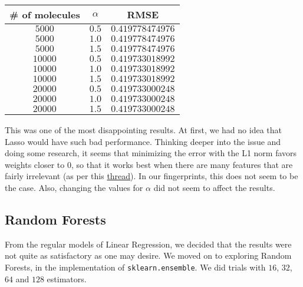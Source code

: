 \documentclass[10pt]{article}
\begin{document}
\begin{center}

\begin{tabular}[center]{|c|c|c|}
\hline
\# of molecules & $\alpha$ & RMSE \\
\hline
$5000$ & $0.5$ & $0.419778474976$ \\
\hline 
$5000$ & $1.0$ & $0.419778474976$ \\
\hline 
$5000$ & $1.5$ & $0.419778474976$ \\
\hline 
$10000$ & $0.5$ & $0.419733018992$ \\
\hline 
$10000$ & $1.0$ & $0.419733018992$ \\
\hline 
$10000$ & $1.5$ & $0.419733018992$ \\
\hline
$20000$ & $0.5$ & $0.419733000248$ \\
\hline 
$20000$ & $1.0$ & $0.419733000248$ \\
\hline 
$20000$ & $1.5$ & $0.419733000248$ \\
\hline
\end{tabular}

\end{center}

\medskip

This was one of the most disappointing results. At first, we had no idea that
Lasso would have such bad performance. Thinking deeper into the issue and 
doing some research, it seems that minimizing the error with the L1 norm favors
weights closer to $0$, so that it works best when there are many features
that are fairly irrelevant (as per this \href{http://stats.stackexchange.com/questions/866/when-should-i-use-lasso-vs-ridge}{thread}).
In our fingerprints, this does not seem to be the case. Also, changing the
values for $\alpha$ did not seem to affect the results.

\subsection{Random Forests}

From the regular models of Linear Regression, we decided that the results
were not quite as satisfactory as one may desire. We moved on to exploring
Random Forests, in the implementation of \verb|sklearn.ensemble|. We did
trials with $16$, $32$, $64$ and $128$ estimators.

\medskip
\end{document}
